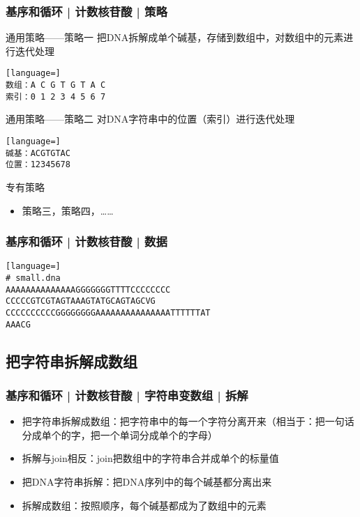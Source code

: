 \begin{frame}[fragile]
  \frametitle{基序和循环 | 计数核苷酸 | 策略}
  \begin{block}{通用策略——策略一}
把DNA拆解成单个碱基，存储到数组中，对数组中的元素进行迭代处理
\begin{lstlisting}[language=]
数组：A C G T G T A C
索引：0 1 2 3 4 5 6 7
\end{lstlisting}
  \vspace{-0.5em}
  \end{block}
  \pause
  \vspace{-0.5em}
  \begin{block}{通用策略——策略二}
    对DNA字符串中的位置（索引）进行迭代处理
  \vspace{-0.5em}
\begin{lstlisting}[language=]
碱基：ACGTGTAC
位置：12345678
\end{lstlisting}
  \vspace{-0.5em}
  \end{block}
  \pause
  \vspace{-0.5em}
  \begin{block}{专有策略}
    \begin{itemize}
      \item 策略三，策略四，……
    \end{itemize}
  \end{block}
\end{frame}

\begin{frame}[fragile]
  \frametitle{基序和循环 | 计数核苷酸 | 数据}
\begin{lstlisting}[language=]
# small.dna
AAAAAAAAAAAAAAGGGGGGGTTTTCCCCCCCC
CCCCCGTCGTAGTAAAGTATGCAGTAGCVG
CCCCCCCCCCGGGGGGGGAAAAAAAAAAAAAAATTTTTTAT
AAACG
\end{lstlisting}
\end{frame}

\subsection{把字符串拆解成数组}
\begin{frame}
  \frametitle{基序和循环 | 计数核苷酸 | 字符串变数组 | 拆解}
  \begin{itemize}
    \item 把字符串拆解成数组：把字符串中的每一个字符分离开来（相当于：把一句话分成单个的字，把一个单词分成单个的字母）
    \item 拆解与join相反：join把数组中的字符串合并成单个的标量值
    \item 把DNA字符串拆解：把DNA序列中的每个碱基都分离出来
    \item 拆解成数组：按照顺序，每个碱基都成为了数组中的元素
  \end{itemize}
\end{frame}


